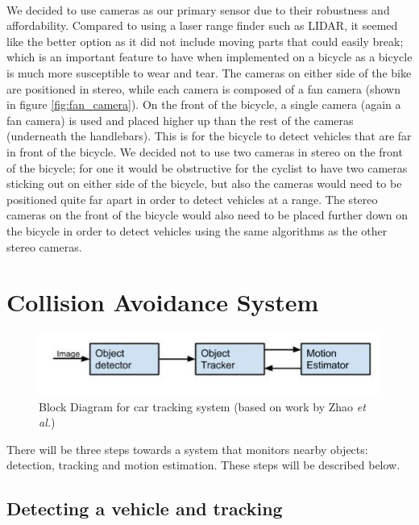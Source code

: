 \documentclass[a4paper]{report}
\begin{document}
{\paragraph{}We decided to use cameras as our primary sensor due to their robustness and affordability. Compared to using a laser range finder such as LIDAR, it seemed like the better option as it did not include moving parts that could easily break; which is an important feature to have when implemented on a bicycle as a bicycle is much more susceptible to wear and tear. The cameras on either side of the bike are positioned in stereo, while each camera is composed of a fan camera (shown in figure \ref{fig:fan_camera}). On the front of the bicycle, a single camera (again a fan camera) is used and placed higher up than the rest of the cameras (underneath the handlebars). This is for the bicycle to detect vehicles that are far in front of the bicycle. We decided not to use two cameras in stereo on the front of the bicycle; for one it would be obstructive for the cyclist to have two cameras sticking out on either side of the bicycle, but also the cameras would need to be positioned quite far apart in order to detect vehicles at a range. The stereo cameras on the front of the bicycle would also need to be placed further down on the bicycle in order to detect vehicles using the same algorithms as the other stereo cameras.

\section{Collision Avoidance System}
\begin{figure}[H]
\centering
\includegraphics[scale=0.6]{figures/final_design/block_diagram_tracking}
\caption{Block Diagram for car tracking system (based on work by Zhao \textit{et al.}\cite{qualitative_car_tracking})}
\label{fig:block_diagram}
\end{figure}

There will be three steps towards a system that monitors nearby objects: detection, tracking and motion estimation. These steps will be described below.
\subsection{Detecting a vehicle and tracking}
}
\end{document}
